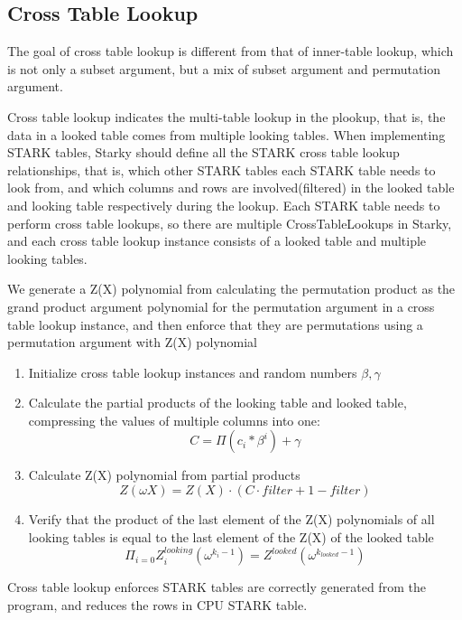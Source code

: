 \subsection{Cross Table Lookup}\label{section: cross-table-lookup}

The goal of cross table lookup is different from that of inner-table lookup, which is not only a subset argument, but a mix of subset argument and permutation argument.

Cross table lookup indicates the multi-table lookup in the plookup\cite{cryptoeprint:2020/315,}, that is, the data in a looked table comes from multiple looking tables. When implementing STARK tables, Starky should define all the STARK cross table lookup relationships, that is, which other STARK tables each STARK table needs to look from, and which columns and rows are involved(filtered) in the looked table and looking table respectively during the lookup. Each STARK table needs to perform cross table lookups, so there are multiple CrossTableLookups in Starky, and each cross table lookup instance consists of a looked table and multiple looking tables.

We generate a Z(X) polynomial from calculating the permutation product as the grand product argument polynomial for the permutation argument in a cross table lookup instance, and then enforce that they are permutations using a permutation argument with Z(X) polynomial

\begin{enumerate}
    \item Initialize cross table lookup instances and random numbers $\beta, \gamma$
    \item Calculate the partial products of the looking table and looked table, compressing the values of multiple columns into one:$$C = \Pi(c_i * \beta^i) + \gamma$$
    \item Calculate Z(X) polynomial from partial products $$Z(\omega X) = Z(X)\cdot (C \cdot filter + 1 - filter)$$
    \item Verify that the product of the last element of the Z(X) polynomials of all looking tables is equal to the last element of the Z(X) of the looked table
    $$\Pi_{i=0} Z^{looking}_{i}(\omega^{k_i-1}) = Z^{looked}(\omega^{k_{looked}-1})$$
\end{enumerate}

Cross table lookup enforces STARK tables are correctly generated from the program, and reduces the rows in CPU STARK table.
